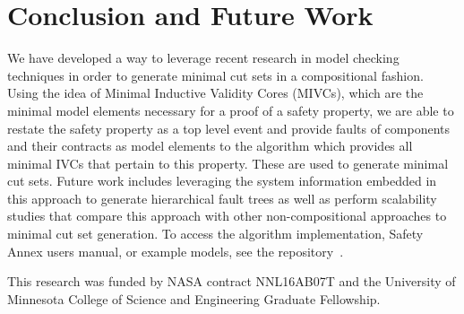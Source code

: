 \section{Conclusion and Future Work}
We have developed a way to leverage recent research in model checking techniques in order to generate minimal cut sets in a compositional fashion. Using the idea of Minimal Inductive Validity Cores (MIVCs), which are the minimal model elements necessary for a proof of a safety property, we are able to restate the safety property as a top level event and provide faults of components and their contracts as model elements to the \aivcalg algorithm which provides all minimal IVCs that pertain to this property. These are used to generate minimal cut sets. Future work includes leveraging the system information embedded in this approach to generate hierarchical fault trees as well as perform scalability studies that compare this approach with other non-compositional approaches to minimal cut set generation.  %
To access the algorithm implementation, Safety Annex users manual, or example models, see the repository~\cite{SAGithub}. 

\vspace{2 mm}
 This research was funded by NASA contract NNL16AB07T and the University of Minnesota College of Science and Engineering Graduate Fellowship.


